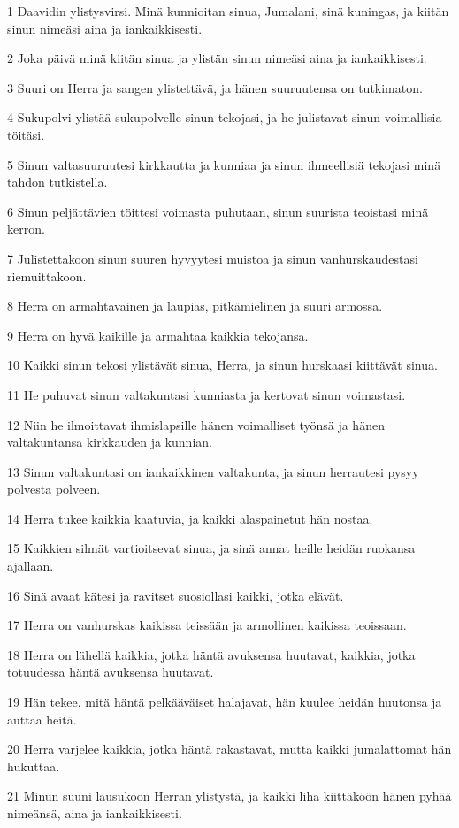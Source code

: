 \par 1 Daavidin ylistysvirsi. Minä kunnioitan sinua, Jumalani, sinä kuningas, ja kiitän sinun nimeäsi aina ja iankaikkisesti.
\par 2 Joka päivä minä kiitän sinua ja ylistän sinun nimeäsi aina ja iankaikkisesti.
\par 3 Suuri on Herra ja sangen ylistettävä, ja hänen suuruutensa on tutkimaton.
\par 4 Sukupolvi ylistää sukupolvelle sinun tekojasi, ja he julistavat sinun voimallisia töitäsi.
\par 5 Sinun valtasuuruutesi kirkkautta ja kunniaa ja sinun ihmeellisiä tekojasi minä tahdon tutkistella.
\par 6 Sinun peljättävien töittesi voimasta puhutaan, sinun suurista teoistasi minä kerron.
\par 7 Julistettakoon sinun suuren hyvyytesi muistoa ja sinun vanhurskaudestasi riemuittakoon.
\par 8 Herra on armahtavainen ja laupias, pitkämielinen ja suuri armossa.
\par 9 Herra on hyvä kaikille ja armahtaa kaikkia tekojansa.
\par 10 Kaikki sinun tekosi ylistävät sinua, Herra, ja sinun hurskaasi kiittävät sinua.
\par 11 He puhuvat sinun valtakuntasi kunniasta ja kertovat sinun voimastasi.
\par 12 Niin he ilmoittavat ihmislapsille hänen voimalliset työnsä ja hänen valtakuntansa kirkkauden ja kunnian.
\par 13 Sinun valtakuntasi on iankaikkinen valtakunta, ja sinun herrautesi pysyy polvesta polveen.
\par 14 Herra tukee kaikkia kaatuvia, ja kaikki alaspainetut hän nostaa.
\par 15 Kaikkien silmät vartioitsevat sinua, ja sinä annat heille heidän ruokansa ajallaan.
\par 16 Sinä avaat kätesi ja ravitset suosiollasi kaikki, jotka elävät.
\par 17 Herra on vanhurskas kaikissa teissään ja armollinen kaikissa teoissaan.
\par 18 Herra on lähellä kaikkia, jotka häntä avuksensa huutavat, kaikkia, jotka totuudessa häntä avuksensa huutavat.
\par 19 Hän tekee, mitä häntä pelkääväiset halajavat, hän kuulee heidän huutonsa ja auttaa heitä.
\par 20 Herra varjelee kaikkia, jotka häntä rakastavat, mutta kaikki jumalattomat hän hukuttaa.
\par 21 Minun suuni lausukoon Herran ylistystä, ja kaikki liha kiittäköön hänen pyhää nimeänsä, aina ja iankaikkisesti.

